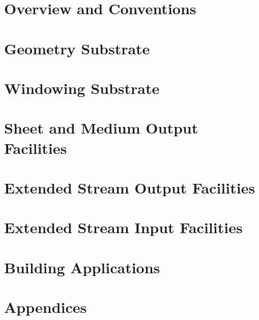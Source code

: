 \part{Overview and Conventions}



\part{Geometry Substrate}




\part{Windowing Substrate}


\part{Sheet and Medium Output Facilities}






\part{Extended Stream Output Facilities}








\part{Extended Stream Input Facilities}






\part{Building Applications}





\part{Appendices}
\appendix







